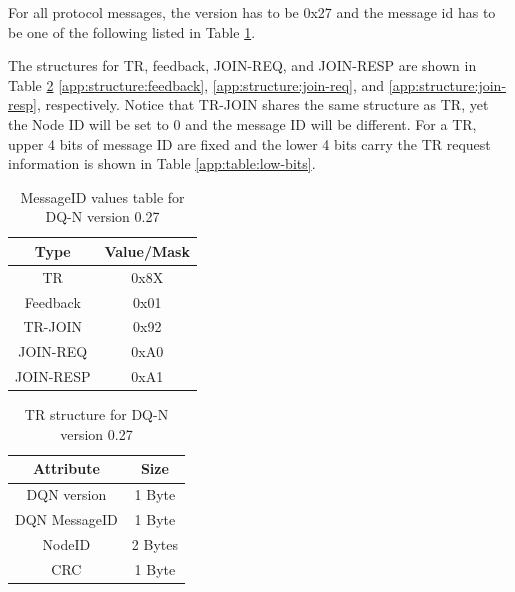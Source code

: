 \documentclass{article}
\begin{document}
For all protocol messages, the version has to be 0x27 and the message id has to be one of the following listed in Table \ref{table:messageid}.

The structures for TR, feedback, JOIN-REQ, and JOIN-RESP are shown in Table \ref{app:structure:tr} \ref{app:structure:feedback}, \ref{app:structure:join-req}, and \ref{app:structure:join-resp}, respectively. Notice that TR-JOIN shares the same structure as TR, yet the Node ID will be set to 0 and the message ID will be different. For a TR, upper 4 bits of message ID are fixed and the lower 4 bits carry the TR request information is shown in Table \ref{app:table:low-bits}.




\begin{table}[H]
\centering
\caption{MessageID values table for DQ-N version 0.27}
\label{table:messageid}
\begin{tabular}{|c|c|}
\hline
Type      & Value/Mask \\ \hline \hline
TR        & 0x8X       \\ \hline
Feedback  & 0x01       \\ \hline
TR-JOIN   & 0x92       \\ \hline
JOIN-REQ  & 0xA0       \\ \hline
JOIN-RESP & 0xA1       \\ \hline
\end{tabular}
\end{table}

\begin{table}[H]
\centering
\caption{TR structure for DQ-N version 0.27}
\label{app:structure:tr}
\begin{tabular}{|c|c|}
\hline
Attribute   & Size  \\ \hline \hline
DQN version   & 1 Byte  \\ \hline
DQN MessageID & 1 Byte  \\ \hline
NodeID        & 2 Bytes \\ \hline
CRC           & 1 Byte  \\ \hline
\end{tabular}
\end{table}
\end{document}
